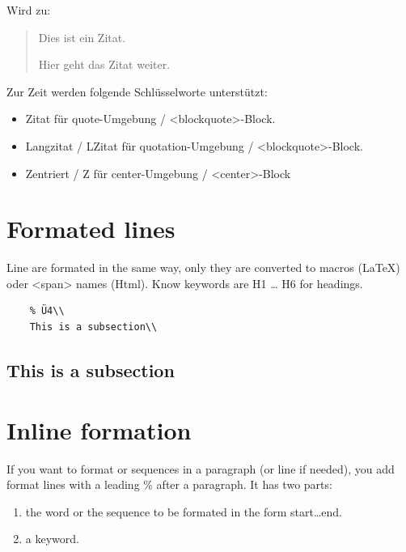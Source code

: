 \documentclass{scrartcl}
\begin{document}
Wird zu:

\begin{quote}
Dies ist ein Zitat.

Hier geht das Zitat weiter.

\end{quote}

Zur Zeit werden folgende Schlüsselworte unterstützt:

\begin{itemize}
\item Zitat für quote-Umgebung / <blockquote>-Block.
\item Langzitat / LZitat für quotation-Umgebung / <blockquote>-Block.
\item Zentriert / Z für center-Umgebung / <center>-Block

\end{itemize}

\section{Formated lines}

Line are formated in the same way, only they are converted
to macros (LaTeX) oder <span> names (Html). Know keywords
are H1 … H6 for headings.

\begin{verbatim}
    % Ü4\\
    This is a subsection\\

\end{verbatim}

\subsection{This is a subsection}

\section{Inline formation}

If you want to format \xspace  or sequences in a paragraph (or
line if needed), you add format lines with a leading \% after
a paragraph. It has two parts:

\begin{enumerate}
\item the word or the sequence to be formated in the form
start…end. 
\item a keyword.

\end{enumerate}
\end{document}
